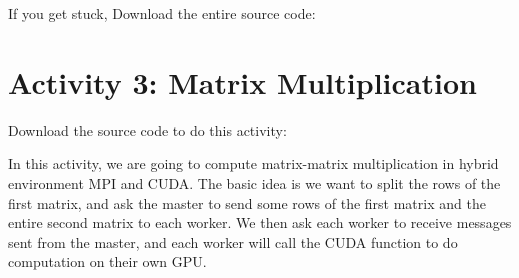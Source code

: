 \documentclass[letterpaper,10pt,openany,oneside]{sphinxmanual}
\begin{document}
If you get stuck, Download the entire source code:
\begin{quote}


\end{quote}


\section{Activity 3: Matrix Multiplication}
\label{Activities/Activities:activity-3-matrix-multiplication}\begin{description}
\item[{Download the source code to do this activity:}] \leavevmode
{}


\end{description}

In this activity, we are going to compute matrix-matrix multiplication in hybrid environment MPI and CUDA. The basic idea is we want to split the rows of the first matrix, and ask the master to send some rows of the first matrix and the entire second matrix to each worker. We then ask each worker to receive messages sent from the master, and each worker will call the CUDA function to do computation on their own GPU.
\end{document}
